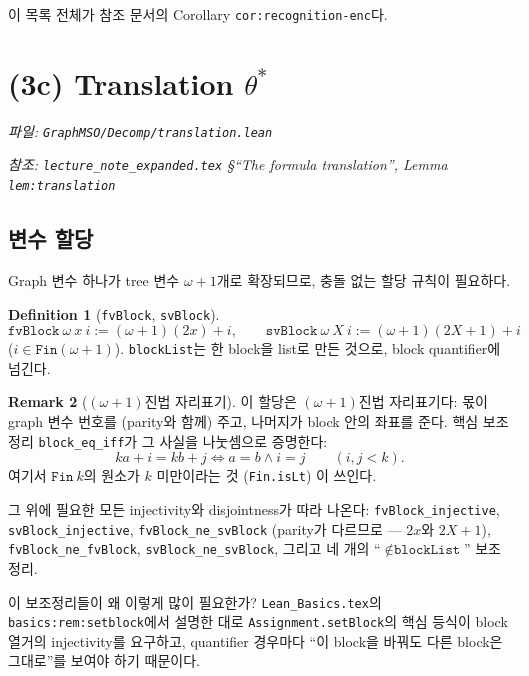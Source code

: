 \documentclass[11pt]{article}
\theoremstyle{definition}
\newtheorem{definition}{Definition}[section]
\newtheorem{remark}[definition]{Remark}
\theoremstyle{plain}
\newcommand{\lean}[1]{\texttt{#1}}
\newcommand{\leanfile}[1]{\texttt{#1}}
\begin{document}
이 목록 전체가 참조 문서의 Corollary \lean{cor:recognition-enc}다.

\section{(3c) Translation \texorpdfstring{$\theta^\ast$}{theta star}}
\label{mso:sec:translation}

\emph{파일: \leanfile{GraphMSO/Decomp/translation.lean}}

\emph{참조: \leanfile{lecture\_note\_expanded.tex} \S``The formula
translation'', Lemma \lean{lem:translation}}

\subsection{변수 할당}

Graph 변수 하나가 tree 변수 $\omega+1$개로 확장되므로, 충돌 없는 할당 규칙이
필요하다.

\begin{definition}[\lean{fvBlock}, \lean{svBlock}]
\label{mso:def:blocks}
\[
  \lean{fvBlock}\ \omega\ x\ i := (\omega+1)(2x) + i,
  \qquad
  \lean{svBlock}\ \omega\ X\ i := (\omega+1)(2X+1) + i
\]
($i \in \lean{Fin}(\omega+1)$). \lean{blockList}는 한 block을 list로 만든 것으로,
block quantifier에 넘긴다.
\end{definition}

\begin{remark}[$(\omega+1)$진법 자리표기]
\label{mso:rem:positional}
이 할당은 $(\omega+1)$진법 자리표기다: 몫이 graph 변수 번호를 (parity와 함께)
주고, 나머지가 block 안의 좌표를 준다. 핵심 보조정리
\lean{block\_eq\_iff}가 그 사실을 나눗셈으로 증명한다:
\[
  k a + i = k b + j \iff a = b \land i = j \qquad (i, j < k).
\]
여기서 $\lean{Fin}\ k$의 원소가 $k$ 미만이라는 것 (\lean{Fin.isLt}) 이 쓰인다.

그 위에 필요한 모든 injectivity와 disjointness가 따라 나온다:
\lean{fvBlock\_injective}, \lean{svBlock\_injective},
\lean{fvBlock\_ne\_svBlock} (parity가 다르므로 --- $2x$와 $2X+1$),
\lean{fvBlock\_ne\_fvBlock}, \lean{svBlock\_ne\_svBlock}, 그리고 네 개의
``$\notin \lean{blockList}$'' 보조정리.

이 보조정리들이 왜 이렇게 많이 필요한가? \leanfile{Lean\_Basics.tex}의
\lean{basics:rem:setblock}에서 설명한 대로 \lean{Assignment.setBlock}의 핵심
등식이 block 열거의 injectivity를 요구하고, quantifier 경우마다 ``이 block을
바꿔도 다른 block은 그대로''를 보여야 하기 때문이다.
\end{remark}
\end{document}
